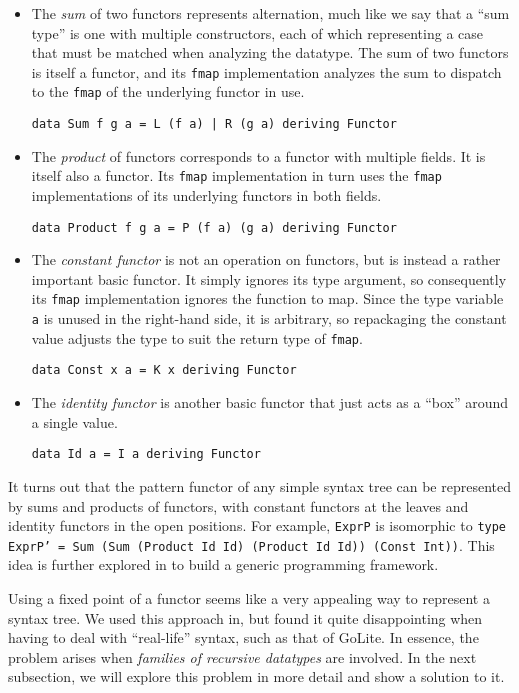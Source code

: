 \documentclass[letterpaper,11pt]{article}
\newcommand{\code}{\texttt}
\begin{document}
\begin{itemize}
    \item
        The \emph{sum} of two functors represents alternation, much like we say
        that a ``sum type'' is one with multiple constructors, each of which
        representing a case that must be matched when analyzing the datatype.
        The sum of two functors is itself a functor, and its \code{fmap}
        implementation analyzes the sum to dispatch to the \code{fmap}
        of the underlying functor in use.

        \code{data Sum f g a = L (f a) | R (g a) deriving Functor}

    \item
        The \emph{product} of functors corresponds to a functor with multiple
        fields. It is itself also a functor. Its \code{fmap} implementation in
        turn uses the \code{fmap} implementations of its underlying functors in
        both fields.

        \code{data Product f g a = P (f a) (g a) deriving Functor}

    \item
        The \emph{constant functor} is not an operation on functors, but is
        instead a rather important basic functor. It simply ignores its type
        argument, so consequently its \code{fmap} implementation ignores the
        function to map. Since the type variable \code{a} is unused in the
        right-hand side, it is arbitrary, so repackaging the constant value
        adjusts the type to suit the return type of \code{fmap}.

        \code{data Const x a = K x deriving Functor}

    \item
        The \emph{identity functor} is another basic functor that just acts as
        a ``box'' around a single value.

        \code{data Id a = I a deriving Functor}
\end{itemize}

It turns out that the pattern functor of any simple syntax tree can be
represented by sums and products of functors, with constant functors at the
leaves and identity functors in the open positions. For example, \code{ExprP}
is isomorphic to \code{type ExprP' = Sum (Sum (Product Id Id) (Product Id Id))
(Const Int))}.  This idea is further explored in\cite{datatypes-a-la-carte} to
build a generic programming framework.

Using a fixed point of a functor seems like a very appealing way to represent a
syntax tree. We used this approach in\cite{Goto}, but found it quite
disappointing when having to deal with ``real-life'' syntax, such as that of
GoLite. In essence, the problem arises when \emph{families of recursive
datatypes} are involved. In the next subsection, we will explore this problem
in more detail and show a solution to it.
\end{document}
